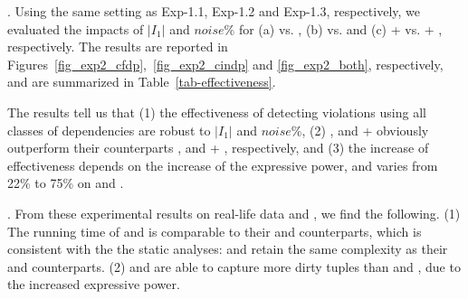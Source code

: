 . Using the same setting as {Exp-1.1}, {Exp-1.2} and {Exp-1.3}, respectively, we evaluated the impacts of $|I_1|$ and $noise\%$ for
(a) {\pCFDs vs. \CFDs}, (b) {\pCINDs vs. \CINDs} and (c) {\pCFDs + \pCINDs vs. \CFDs + \CINDs}, respectively.
%
The results are reported in Figures~\ref{fig_exp2_cfdp},~\ref{fig_exp2_cindp} and \ref{fig_exp2_both}, respectively, and are summarized in Table~\ref{tab-effectiveness}.

The results tell us that (1) the effectiveness of detecting violations using all classes of dependencies are robust to $|I_1|$ and $noise\%$,
%
(2) \pCFDs, \pCINDs and \pCFDs + \pCINDs obviously outperform their counterparts \CFDs, \CINDs and \CFDs + \CINDs, respectively, and
%
(3) the increase of effectiveness depends on the increase of the expressive power, and varies from 22\% to 75\% on \hosp and \dblp.




. From these experimental results on real-life data \hosp and \dblp, we find the following.
(1) The running time of \pCFDs and \pCINDs is comparable to their \CFDs and \CINDs counterparts, which is consistent with the
the static analyses:  \pCFDs and \pCINDs retain the same complexity
as their \CFDs and \CINDs counterparts.
(2) \pCFDs and \pCINDs are able to capture more dirty tuples than \CFDs and \CINDs, due to the increased expressive power.








\eat{%
\begin{figure}[tb!]
  \centering
  \centering
  \subfigure[Varying $|I_{1}|$ for \hosp]{\epsfig{file=exp-fig/21a.eps}}  %
  \quad
  \subfigure[Varying $noise\%$ for \hosp]{\epsfig{file=exp-fig/21b.eps}}
  \quad
  \subfigure[Varying $|I_{1}|$ for \dblp]{\epsfig{file=exp-fig/21c.eps}}
  \quad
  \subfigure[Varying $noise\%$ for \dblp]{\epsfig{file=exp-fig/21d.eps}}
  \caption{Effectiveness of detecting \pCFD violations}\label{fig_exp2_cfdp}
\end{figure}
}

\eat{\begin{figure}[tb!]
  \centering
  \centering
  \subfigure[Varying $|I_{1}|$ for \hosp]{\epsfig{file=exp-fig/22a.eps}}  %
  \quad
  \subfigure[Varying $noise\%$ for \hosp]{\epsfig{file=exp-fig/22b.eps}}
  \quad
  \subfigure[Varying $|I_{1}|$ for \dblp]{\epsfig{file=exp-fig/22c.eps}}
  \quad
  \subfigure[Varying $noise\%$ for \dblp]{\epsfig{file=exp-fig/22d.eps}}
  \caption{Effectiveness of detecting \pCIND violations}\label{fig_exp2_cindp}
\end{figure}
}

